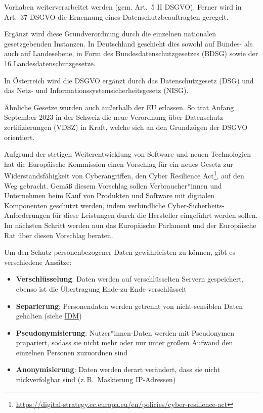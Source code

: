 \documentclass[
  11pt,
  letterpaper,
  DIV=11,
  twoside]{scrreprt}
\DeclareRobustCommand{\href}[2]{#2\footnote{\url{#1}}}
\begin{document}
Vorhaben weiterverarbeitet werden (gem. Art.~5 II DSGVO). Ferner wird in
Art.~37 DSGVO die Ernennung eines Datenschutzbeauftragten geregelt.

Ergänzt wird diese Grundverordnung durch die einzelnen nationalen
gesetzgebenden Instanzen. In Deutschland geschieht dies sowohl auf
Bundes- als auch auf Landesebene, in Form des Bundesdatenschutzgesetzes
(BDSG) sowie der 16 Landesdatenschutzgesetze.

In Österreich wird die DSGVO ergänzt durch das Datenschutzgesetz (DSG)
und das Netz- und Informationssystemsicherheitsgesetz (NISG).

Ähnliche Gesetze wurden auch außerhalb der EU erlassen. So trat Anfang
September 2023 in der Schweiz die neue Verordnung über
Datenschutz-zertifizierungen (VDSZ) in Kraft, welche sich an den
Grundzügen der DSGVO orientiert.

Aufgrund der stetigen Weiterentwicklung von Software und neuen
Technologien hat die Europäische Kommission einen Vorschlag für ein
neues Gesetz zur Widerstandsfähigkeit von Cyberangriffen, den
\href{https://digital-strategy.ec.europa.eu/en/policies/cyber-resilience-act}{Cyber
Resilience Act}, auf den Weg gebracht. Gemäß diesem Vorschlag sollen
Verbraucher*innen und Unternehmen beim Kauf von Produkten und Software
mit digitalen Komponenten geschützt werden, indem verbindliche
Cyber-Sicherheits-Anforderungen für diese Leistungen durch die
Hersteller eingeführt werden sollen. Im nächsten Schritt werden nun das
Europäische Parlament und der Europäische Rat über diesen Vorschlag
beraten.

Um den Schutz personenbezogener Daten gewährleisten zu können, gibt es
verschiedene Ansätze:

\begin{itemize}
\item
  \textbf{Verschlüsselung}: Daten werden auf verschlüsselten Servern
  gespeichert, ebenso ist die Übertragung Ende-zu-Ende verschlüsselt
\item
  \textbf{Separierung}: Personendaten werden getrennt von
  nicht-sensiblen Daten gehalten (siehe
  \hyperref[identity-management]{IDM})
\item
  \textbf{Pseudonymisierung}: Nutzer*innen-Daten werden mit Pseudonymen
  präpariert, sodass sie nicht mehr oder nur unter großem Aufwand den
  einzelnen Personen zuzuordnen sind
\item
  \textbf{Anonymisierung}: Daten werden derart verändert, dass sie nicht
  rückverfolgbar sind (z.\,B.~Maskierung IP-Adressen)
\end{itemize}
\end{document}
